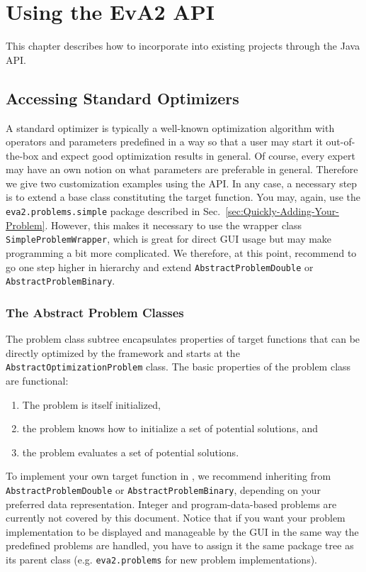 \chapter{Using the EvA2 API\label{sec:Using-the-API}}

This chapter describes how to incorporate  into existing
projects through the Java API.


\section{Accessing Standard Optimizers\label{sub:Accessing-Standard-Optimizers}}

A standard optimizer is typically a well-known optimization algorithm
with operators and parameters predefined in a way so that a user may
start it out-of-the-box and expect good optimization results in general.
Of course, every expert may have an own notion on what parameters
are preferable in general. Therefore we give two customization examples
using the API. In any case, a necessary step is to extend a 
base class constituting the target function. You may, again, use the
\texttt{eva2.problems.simple} package described in Sec.~\ref{sec:Quickly-Adding-Your-Problem}.
However, this makes it necessary to use the wrapper class \texttt{SimpleProblemWrapper},
which is great for direct GUI usage but may make programming a bit
more complicated. We therefore, at this point, recommend to go one
step higher in hierarchy and extend \texttt{AbstractProblemDouble}
or \texttt{AbstractProblemBinary}.


\subsection{The Abstract Problem Classes\label{sub:The-Abstract-Problem-classes}}

The problem class subtree encapsulates properties of target functions
that can be directly optimized by the  framework and starts
at the \texttt{AbstractOptimizationProblem} class. The basic properties
of the problem class are functional: 
\begin{enumerate}
\item The problem is itself initialized, 
\item the problem knows how to initialize a set of potential solutions,
and 
\item the problem evaluates a set of potential solutions. 
\end{enumerate}
To implement your own target function in , we recommend
inheriting from \texttt{AbstractProblemDouble} or \texttt{AbstractProblemBinary},
depending on your preferred data representation. Integer and program-data-based
problems are currently not covered by this document. Notice that if
you want your problem implementation to be displayed and manageable
by the GUI in the same way the predefined problems are handled, you
have to assign it the same package tree as its parent class (e.g.
\texttt{eva2.problems} for new problem implementations).


